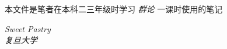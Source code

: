     本文件是笔者在本科二三年级时学习 \emph{群论} 一课时使用的笔记

    \begin{flushright}
        \textit{Sweet Pastry} \\[1em]
        \textit{复旦大学}
    \end{flushright}